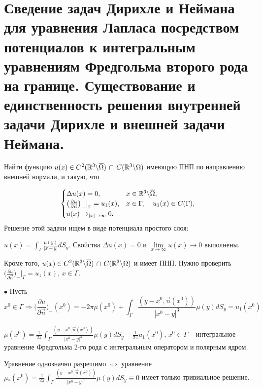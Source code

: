 \section{Сведение задач Дирихле и Неймана для уравнения Лапласа посредством потенциалов к интегральным уравнениям Фредгольма второго рода на границе. Существование и единственность решения внутренней задачи Дирихле и внешней задачи Неймана.}


Найти функцию $u(x) \in C^2(\mathbb{R}^3 \backslash \overline{\Omega}) \, \cap \, C(\mathbb{R}^3 \backslash \Omega)$ имеющую ПНП по направлению внешней нормали, и такую, что 

\begin{equation}
 \begin{cases}
 \Delta u(x) = 0, &x \in \mathbb{R}^3 \backslash \overline{\Omega},
  \\
   \big(\frac{\partial u}{\partial \vec{n}}\big)_- \big|_{{\Gamma}} = u_1(x), & x \in {\Gamma}, \quad u_1(x) \in C({\Gamma}),
   \\
   u(x) \to_{|x| \to \infty} 0.\\
 \end{cases}
\end{equation}
Решение этой задачи ищем в виде потенциала простого слоя: 

$u(x) = \int_{\Gamma} \frac{\mu(y)}{|x - y|} dS_y$. Свойства $\Delta u(x) = 0$ и $\lim\limits_{x \to \infty} u(x) \to 0$ выполнены.

Кроме того, $u(x) \in C^2(\mathbb{R}^3 \backslash \overline{\Omega}) \, \cap \, C(\mathbb{R}^3 \backslash \Omega)$ и имеет ПНП. Нужно проверить $\big(\frac{\partial u}{\partial \vec{n}}\big)_- \big|_{{\Gamma}} = u_1(x), \, x \in {\Gamma}$. 

$\bullet$ Пусть $$x^0 \in {\Gamma} \Rightarrow \bigg(\frac{\partial u}{\partial \vec{n}}\bigg)_-(x^0) = -2\pi \mu(x^0) + \int_{\Gamma} \frac{(y - x^0, \vec{n}(x^0))}{|x^0 - y|^3}\mu(y)dS_y = u_1(x^0)$$

$\mu(x^0) = \frac{1}{2\pi}\int_{\Gamma} \frac{(y - x^0, \vec{n}(x^0))}{|x^0 - y|^3}\mu(y)dS_y - \frac{1}{2\pi}u_1(x^0), \, x^0 \in {\Gamma} $ -- интегральное уравнение Фредгольма 2-го рода с интегральным оператором и полярным ядром.

Уравнение однозначно разрешимо $\Leftrightarrow$ уравнение $\mu_*(x^0) = \frac{1}{2\pi}\int_{\Gamma} \frac{(y - x^0, \vec{n}(x^0))}{|x^0 - y|^3}\mu(y)dS_y \equiv 0 $ имеет только тривиальное решение. 

